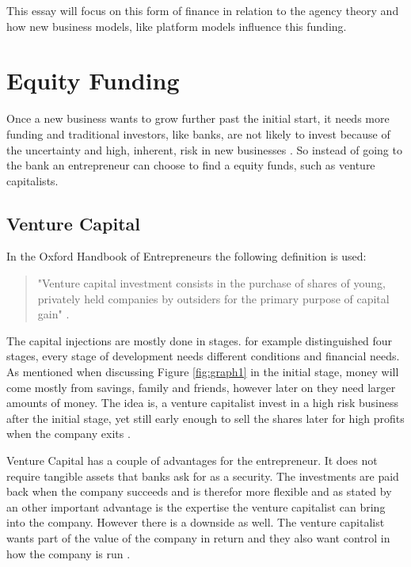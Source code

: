 \documentclass[a4paper, 11pt]{article}
\begin{document}
This essay will focus on this form of finance in relation to the agency theory and how new business models, like platform models influence this funding.

\section{Equity Funding}

Once a new business wants to grow further past the initial start, it needs more funding and traditional investors, like banks, are not likely to invest because of the uncertainty and high, inherent, risk in new businesses \citep{Osnabrugge2000}. So instead of going to the bank an entrepreneur can choose to find a equity funds, such as venture capitalists.

\subsection{Venture Capital}

In the Oxford Handbook of Entrepreneurs the following definition is used:

\begin{quote}
"Venture capital investment consists in the purchase of shares of young, privately held companies by outsiders for the primary purpose of capital gain" \citep[P.355]{casson2008oxford}.
\end{quote}

The capital injections are mostly done in stages. \cite{TiddBessant} for example distinguished four stages, every stage of development needs different conditions and financial needs. As mentioned when discussing Figure \ref{fig:graph1} in the initial stage, money will come mostly from savings, family and friends, however later on they need larger amounts of money. The idea is, a venture capitalist invest in a high risk business after the initial stage, yet still early enough to sell the shares later for high profits when the company exits \citep{TiddBessant}.

Venture Capital has a couple of advantages for the entrepreneur. It does not require tangible assets that banks ask for as a security. The investments are paid back when the company succeeds and is therefor more flexible and as stated by \cite{casson2008oxford} an other important advantage is the expertise the venture capitalist can bring into the company. However there is a downside as well. The venture capitalist wants part of the value of the company in return and they also want control in how the company is run \citep{casson2008oxford}.
\end{document}

